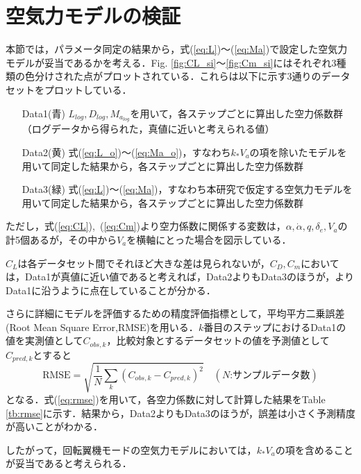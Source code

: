 \section{空気力モデルの検証}
\label{sec:airf_model_ver}

本節では，パラメータ同定の結果から，式(\ref{eq:L})〜(\ref{eq:Ma})で設定した空気力モデルが妥当であるかを考える．Fig. \ref{fig:CL_si}〜\ref{fig:Cm_si}にはそれぞれ3種類の色分けされた点がプロットされている．これらは以下に示す3通りのデータセットをプロットしている．

\begin{itemize}
  \setlength{\leftskip}{1.0cm}
  \setlength{\rightskip}{0.5cm}
  \item[Data1(青)] $L_{log},D_{log},M_{a_{log}}$を用いて，各ステップごとに算出した空力係数群\\（ログデータから得られた，真値に近いと考えられる値）
  \item[Data2(黄)] 式(\ref{eq:L_o})〜(\ref{eq:Ma_o})，すなわち$k_* V_a$の項を除いたモデルを用いて同定した結果から，各ステップごとに算出した空力係数群
  \item[Data3(緑)] 式(\ref{eq:L})〜(\ref{eq:Ma})，すなわち本研究で仮定する空気力モデルを用いて同定した結果から，各ステップごとに算出した空力係数群
\end{itemize}

ただし，式(\ref{eq:CL}),~(\ref{eq:Cm})より空力係数に関係する変数は，$\alpha,\dot{\alpha},q,\delta_e,V_a$の計5個あるが，その中から$V_a$を横軸にとった場合を図示している．

$C_L$は各データセット間でそれほど大きな差は見られないが，$C_D,C_m$においては，Data1が真値に近い値であると考えれば，Data2よりもData3のほうが，よりData1に沿うように点在していることが分かる．

さらに詳細にモデルを評価するための精度評価指標として，平均平方二乗誤差(Root Mean Square Error,RMSE)を用いる．$k$番目のステップにおけるData1の値を実測値として$C_{obs,k}$，比較対象とするデータセットの値を予測値として$C_{pred,k}$とすると
\begin{equation}
  \mbox{RMSE} = \sqrt{\dfrac{1}{N}\sum_{k}(C_{obs,k}-C_{pred,k})^{2}} \quad (N\mbox{:サンプルデータ数})
  \label{eq:rmse}
\end{equation}
となる\cite{}．式(\ref{eq:rmse})を用いて，各空力係数に対して計算した結果をTable \ref{tb:rmse}に示す．結果から，Data2よりもData3のほうが，誤差は小さく予測精度が高いことがわかる．

したがって，回転翼機モードの空気力モデルにおいては，$k_* V_a$の項を含めることが妥当であると考えられる．

